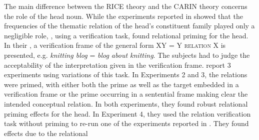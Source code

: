 The main difference between the RICE theory and the CARIN theory
concerns the role of the head noun. While the experiments reported in
\citet{GagneandShoben:1997} showed that the frequencies of the
thematic relation of the head's constituent family played only a
negligible role, \citet{Spaldingetal:2010}, using a verification task, found
relational priming for the head. In their , a verification frame of the general form XY = Y \textsc{relation}
X is presented, e.g. \emph{knitting blog} = \emph{blog about
  knitting}. 
The subjects had to
judge the acceptability of the interpretation given in the
verification frame. \citet{Spaldingetal:2010} report 3 experiments
using variations of this task. In Experiments 2 and 3, the relations were primed,
with either both the prime as well as the target 
embedded in a verification frame or the prime occurring in a
sentential frame making clear the intended conceptual relation. In both experiments, they found robust relational
priming effects for the head.
In Experiment 4, they used the relation verification task
without priming to re-run one of the
experiments reported in \citet{GagneandShoben:1997}.
They found effects due to the relational
